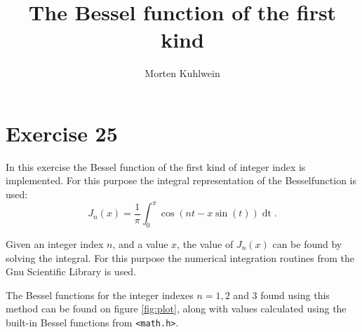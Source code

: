 \documentclass[a4paper,twocolumn]{article}
\title{The Bessel function of the first kind}
\date{}
\author{Morten Kuhlwein}
\begin{document}
	\maketitle
	\section*{Exercise 25}
	In this exercise the Bessel function of the first kind of integer index is implemented.
	For this purpose the integral representation of the Besselfunction is used:
	\begin{equation}
		J_{n} (x) = \frac{1}{\pi} \int_{0}^{\pi} \cos{(n t - x \sin{(t)})} \mathop{\mathrm{d} t}.
	\end{equation}
	
	Given an integer index $ n $, and a value $ x $, the value of $ J_{n} (x) $ can be found by solving the integral.
	For this purpose the numerical integration routines from the Gnu Scientific Library is used.

	The Bessel functions for the integer indexes $ n = 1, 2 $ and $ 3 $ found using this method can be found on figure \ref{fig:plot}, along with values calculated using the built-in Bessel functions from {\tt<math.h>}.


	\begin{figure*}[t]
		\centering
		
		\caption{Comparison of the calculated Bessel functions and the functions from {\tt<math.h>}.}
		\label{fig:plot}
	\end{figure*}
\end{document}
